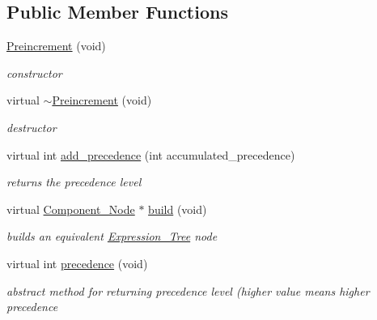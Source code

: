 \subsection*{Public Member Functions}
\begin{DoxyCompactItemize}
\item 
\hyperlink{classMadara_1_1Expression__Tree_1_1Preincrement_a004a016ceb0a222bc204d8aef3ec6898}{Preincrement} (void)
\begin{DoxyCompactList}\small\item\em constructor \item\end{DoxyCompactList}\item 
virtual \hyperlink{classMadara_1_1Expression__Tree_1_1Preincrement_a58bb6d4276f37d9ed13385d98065de9f}{$\sim$Preincrement} (void)
\begin{DoxyCompactList}\small\item\em destructor \item\end{DoxyCompactList}\item 
virtual int \hyperlink{classMadara_1_1Expression__Tree_1_1Preincrement_a60a8b422a0597632cc8ffcdc961213e3}{add\_\-precedence} (int accumulated\_\-precedence)
\begin{DoxyCompactList}\small\item\em returns the precedence level \item\end{DoxyCompactList}\item 
virtual \hyperlink{classMadara_1_1Expression__Tree_1_1Component__Node}{Component\_\-Node} $\ast$ \hyperlink{classMadara_1_1Expression__Tree_1_1Preincrement_ab9600c8a5691791905e01daa7a7b548a}{build} (void)
\begin{DoxyCompactList}\small\item\em builds an equivalent \hyperlink{classMadara_1_1Expression__Tree_1_1Expression__Tree}{Expression\_\-Tree} node \item\end{DoxyCompactList}\item 
virtual int \hyperlink{classMadara_1_1Expression__Tree_1_1Symbol_ac060dedb8d16864591b259df375109b3}{precedence} (void)
\begin{DoxyCompactList}\small\item\em abstract method for returning precedence level (higher value means higher precedence \item\end{DoxyCompactList}\end{DoxyCompactItemize}
